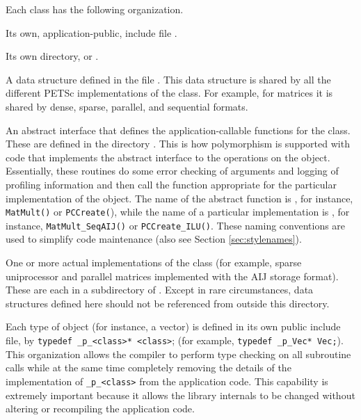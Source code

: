 Each class has the following organization.
\begin{tightitemize}
\item Its own, application-public, include file .
\item Its own directory,  or .
\item A data structure defined in  the file
      .
      This data structure is shared by all the different PETSc implementations of the
      class. For example, for matrices it is shared by dense,
      sparse, parallel, and sequential formats.
\item An abstract interface that defines the application-callable
      functions for the class. These are defined in the directory
      . This is how polymorphism is supported with code that implements the abstract interface to the
operations on the object.  Essentially, these routines do some error
checking of arguments and logging of profiling information
and then call the function appropriate for the
particular implementation of the object. The name of the abstract
    function is , for instance, \lstinline{MatMult()} or \lstinline{PCCreate(}), while
the name of a particular implementation is
, for instance,
\lstinline{MatMult_SeqAIJ()} or \lstinline{PCCreate_ILU()}. These naming
    conventions are used to simplify code maintenance (also see Section \ref{sec:stylenames}).

\item One or more actual implementations of the class (for example,
      sparse uniprocessor and parallel matrices implemented with the AIJ storage format).
      These are each in a subdirectory of
      . Except in rare circumstances, data
      structures defined here should not be referenced from outside this
      directory.
\end{tightitemize}

Each type of object (for instance, a vector) is defined in its own
public include file, by \lstinline{typedef _p_<class>* <class>}; (for example, \lstinline{typedef _p_Vec* Vec;}).
  This organization allows the compiler to perform type checking on all subroutine calls
while at the same time
completely removing the details of the implementation of \lstinline{_p_<class>} from the application code.  This capability is extremely important
because it allows the library internals to be changed
without altering or recompiling the application code.

